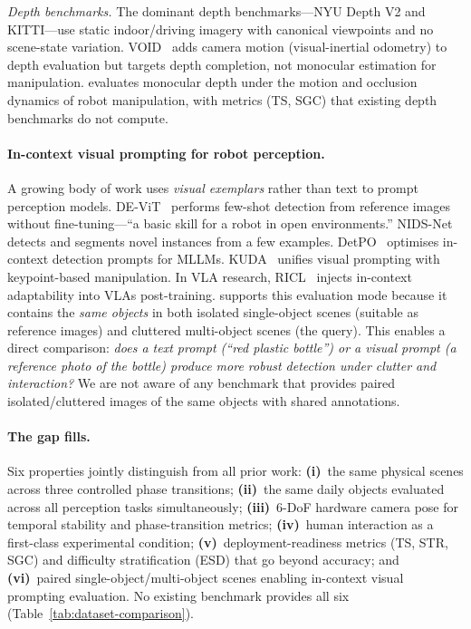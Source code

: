 \textit{Depth benchmarks.}
The dominant depth benchmarks---NYU Depth V2 and KITTI---use static indoor/driving imagery with canonical viewpoints and no scene-state variation.
VOID~\citep{wong2020void} adds camera motion (visual-inertial odometry) to depth evaluation but targets depth completion, not monocular estimation for manipulation.
\coolname{} evaluates monocular depth under the motion and occlusion dynamics of robot manipulation, with metrics (TS, SGC) that existing depth benchmarks do not compute.

\paragraph{In-context visual prompting for robot perception.}
A growing body of work uses \textit{visual exemplars} rather than text to prompt perception models.
DE-ViT~\citep{zhang2024devit} performs few-shot detection from reference images without fine-tuning---``a basic skill for a robot in open environments.''
NIDS-Net~\citep{lu2025nidsnet} detects and segments novel instances from a few examples.
DetPO~\citep{detpo2026} optimises in-context detection prompts for MLLMs.
KUDA~\citep{kuda2025} unifies visual prompting with keypoint-based manipulation.
In VLA research, RICL~\citep{sridhar2025ricl} injects in-context adaptability into VLAs post-training.
\coolname{} supports this evaluation mode because it contains the \textit{same objects} in both isolated single-object scenes (suitable as reference images) and cluttered multi-object scenes (the query).
This enables a direct comparison: \textit{does a text prompt (``red plastic bottle'') or a visual prompt (a reference photo of the bottle) produce more robust detection under clutter and interaction?}
We are not aware of any benchmark that provides paired isolated/cluttered images of the same objects with shared annotations.

\paragraph{The gap \coolname{} fills.}
Six properties jointly distinguish \coolname{} from all prior work:
\textbf{(i)}~the same physical scenes across three controlled phase transitions;
\textbf{(ii)}~the same daily objects evaluated across all perception tasks simultaneously;
\textbf{(iii)}~6-DoF hardware camera pose for temporal stability and phase-transition metrics;
\textbf{(iv)}~human interaction as a first-class experimental condition;
\textbf{(v)}~deployment-readiness metrics (TS, STR, SGC) and difficulty stratification (ESD) that go beyond accuracy; and
\textbf{(vi)}~paired single-object/multi-object scenes enabling in-context visual prompting evaluation.
No existing benchmark provides all six (Table~\ref{tab:dataset-comparison}).

